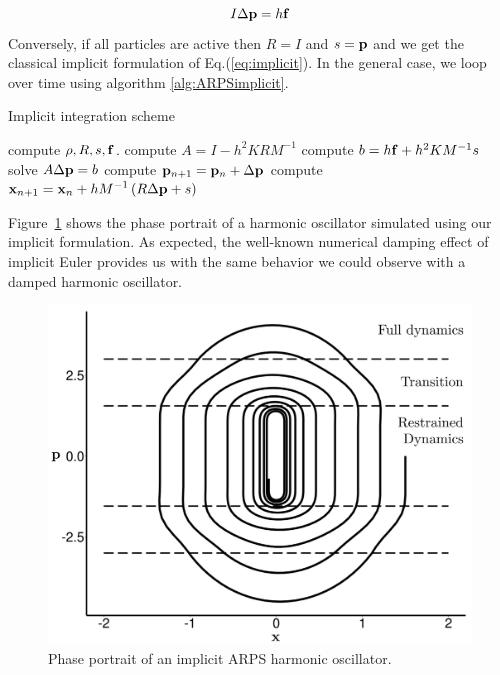 \begin{equation}
    \label{eq:ARPSImplicitRestrained}
    I \Delta \mathbf{p} = h \mathbf{f}
\end{equation}
Conversely, if all particles are active then $R = I$ and $s = \mathbf{p}$ and we get the classical implicit formulation of Eq.(\ref{eq:implicit}).
In the general case, we loop over time using algorithm \ref{alg:ARPSimplicit}.
\begin{algorithm}[H]
    \caption[ARPS: Implicit integration scheme]{Implicit integration scheme}
    \label{alg:ARPSimplicit}
    \begin{algorithmic}[10]
	    \State compute $\rho, R, s, \mathbf{f}$.
	    \State compute $A = I - h^{2}KRM^{-1}$
	    \State compute $b = h \mathbf{f} + h^{2}KM^{-1}s$
	    \State solve $A \Delta \mathbf{p} = b$
            \State compute $\mathbf{p}_{n+1} = \mathbf{p}_{n} + \Delta \mathbf{p}$
	    \State compute $\displaystyle \mathbf{x}_{n+1} = \mathbf{x}_{n} +
            hM^{-1}\left( R\Delta \mathbf{p}+ s \right)$
	\EndFor
    \end{algorithmic}
\end{algorithm}

Figure~\ref{fig:implicitHOPP} shows the phase portrait of a harmonic oscillator simulated using our implicit formulation.
As expected, the well-known numerical damping effect of implicit Euler provides us with the same behavior we could observe with a damped harmonic oscillator.

\begin{figure}[!h]
	\centering
	\includegraphics[width=0.8\linewidth]{images/arps-vriphys2013/implicitHOPPraw_hacked.png}
	\caption[ARPS: Phase portrait of an implicit ARPS harmonic oscillator]{\label{fig:implicitHOPP} Phase portrait of an implicit ARPS harmonic oscillator.}
\end{figure}

